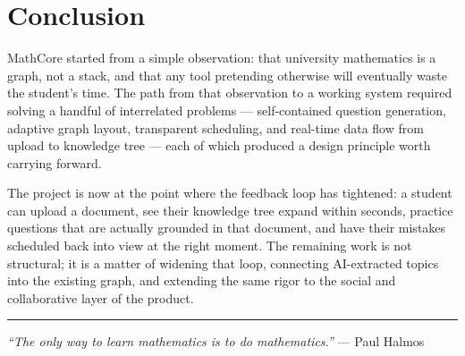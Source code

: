 \documentclass[11pt,a4paper]{article}
\begin{document}
\section{Conclusion}

MathCore started from a simple observation: that university mathematics is a graph, not a stack, and that any tool pretending otherwise will eventually waste the student's time. The path from that observation to a working system required solving a handful of interrelated problems --- self-contained question generation, adaptive graph layout, transparent scheduling, and real-time data flow from upload to knowledge tree --- each of which produced a design principle worth carrying forward.

The project is now at the point where the feedback loop has tightened: a student can upload a document, see their knowledge tree expand within seconds, practice questions that are actually grounded in that document, and have their mistakes scheduled back into view at the right moment. The remaining work is not structural; it is a matter of widening that loop, connecting AI-extracted topics into the existing graph, and extending the same rigor to the social and collaborative layer of the product.

\vspace{1em}
\hrule
\vspace{0.6em}
\begin{center}
\small\color{mcslate!80}
\emph{``The only way to learn mathematics is to do mathematics.''} --- Paul Halmos
\end{center}
\end{document}
